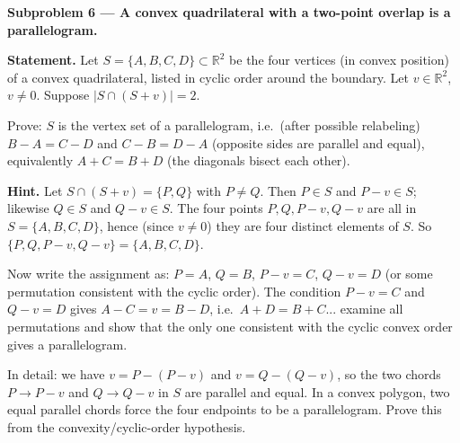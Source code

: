 \documentclass{article}
\begin{document}
\textbf{Subproblem 6 --- A convex quadrilateral with a two-point overlap is a parallelogram.}

\medskip
\textbf{Statement.}
Let $S = \{A,B,C,D\}\subset\mathbb{R}^2$ be the four vertices (in convex position) of a convex quadrilateral, listed in cyclic order around the boundary.
Let $v\in\mathbb{R}^2$, $v\neq 0$.  Suppose $|S\cap(S+v)| = 2$.

Prove: $S$ is the vertex set of a parallelogram, i.e.\ (after possible relabeling) $B-A = C-D$ and $C-B = D-A$ (opposite sides are parallel and equal), equivalently $A+C = B+D$ (the diagonals bisect each other).

\medskip
\textbf{Hint.}
Let $S\cap(S+v) = \{P,Q\}$ with $P\neq Q$.  Then $P\in S$ and $P-v\in S$; likewise $Q\in S$ and $Q-v\in S$.  The four points $P,Q,P-v,Q-v$ are all in $S = \{A,B,C,D\}$, hence (since $v\neq 0$) they are four distinct elements of $S$.  So $\{P,Q,P-v,Q-v\} = \{A,B,C,D\}$.

Now write the assignment as: $P = A$, $Q = B$, $P-v = C$, $Q-v = D$ (or some permutation consistent with the cyclic order).  The condition $P-v = C$ and $Q-v = D$ gives $A-C = v = B-D$, i.e.\ $A+D = B+C$... examine all permutations and show that the only one consistent with the cyclic convex order gives a parallelogram.

In detail: we have $v = P - (P-v)$ and $v = Q - (Q-v)$, so the two chords $P\to P-v$ and $Q\to Q-v$ in $S$ are parallel and equal.  In a convex polygon, two equal parallel chords force the four endpoints to be a parallelogram.  Prove this from the convexity/cyclic-order hypothesis.
\end{document}
